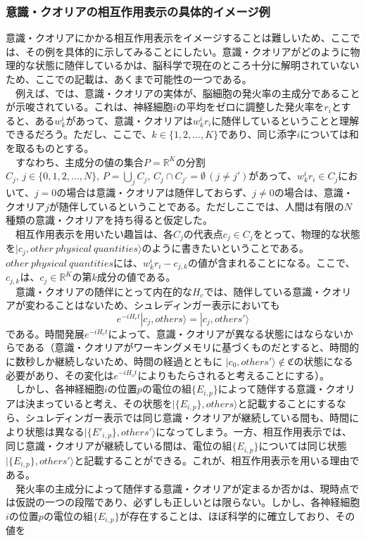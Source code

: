 \subsubsection{意識・クオリアの相互作用表示の具体的イメージ例}
意識・クオリアにかかる相互作用表示をイメージすることは難しいため、ここでは、その例を具体的に示してみることにしたい。意識・クオリアがどのように物理的な状態に随伴しているかは、脳科学で現在のところ十分に解明されていないため、ここでの記載は、あくまで可能性の一つである。\\
　例えば、\cite{Murray_2016}では、意識・クオリアの実体が、脳細胞の発火率の主成分であることが示唆されている。これは、神経細胞$i$の平均をゼロに調整した発火率を$r_i$とすると、ある$w_k^i$があって、意識・クオリアは$w_k^ir_i$に随伴しているということと理解できるだろう。ただし、ここで、$k\in\{1,2,\ldots,K\}$であり、同じ添字$i$については和を取るものとする。\\
　すなわち、主成分の値の集合$P=\mathbb{R}^K$の分割$C_j,\,j\in\{0,1,2,\ldots,N\},\, P=\bigcup_j C_j,\, C_j \cap C_{j'}=\emptyset \, (j \neq j')$があって、$w_k^ir_i \in C_j$において、$j=0$の場合は意識・クオリアは随伴しておらず、$j \neq 0$の場合は、意識・クオリア$j$が随伴しているということである。ただしここでは、人間は有限の$N$種類の意識・クオリアを持ち得ると仮定した。\\
　相互作用表示を用いたい趣旨は、各$C_j$の代表点$c_j \in C_j$をとって、物理的な状態を$|c_j,other \ physical \ quantities \rangle$のように書きたいということである。$other \ physical \  quantities$には、$w_k^ir_i - c_{j,k}$の値が含まれることになる。ここで、$c_{j,k}$は、$c_j \in \mathbb{R}^K$の第$k$成分の値である。\\
　意識・クオリアの随伴にとって内在的な$H_c$では、随伴している意識・クオリアが変わることはないため、シュレディンガー表示においても
\begin{equation}
  e^{-iH_ct}|c_j,others \rangle = |c_j,others' \rangle 
\end{equation}
である。時間発展$e^{-iH_ct}$によって、意識・クオリアが異なる状態にはならないからである（意識・クオリアがワーキングメモリに基づくものだとすると、時間的に数秒しか継続しないため、時間の経過とともに $|c_0,others' \rangle \notin \mathfrak{C}$の状態になる必要があり、その変化は$e^{-iH_ot}$によりもたらされると考えることにする）。\\
　しかし、各神経細胞$i$の位置$p$の電位の組$\{E_{i,p}\}$によって随伴する意識・クオリアは決まっていると考え、その状態を$|\{ E_{i,p}\},others \rangle$と記載することにするなら、シュレディンガー表示では同じ意識・クオリアが継続している間も、時間により状態は異なる$|\{ E'_{i,p}\},others' \rangle$になってしまう。一方、相互作用表示では、同じ意識・クオリアが継続している間は、電位の組$\{E_{i,p}\}$については同じ状態$|\{ E_{i,p}\},others' \rangle$と記載することができる。これが、相互作用表示を用いる理由である。\\
　発火率の主成分によって随伴する意識・クオリアが定まるか否かは、現時点では仮説の一つの段階であり、必ずしも正しいとは限らない。しかし、各神経細胞$i$の位置$p$の電位の組$\{E_{i,p}\}$が存在することは、ほぼ科学的に確立しており、その値を